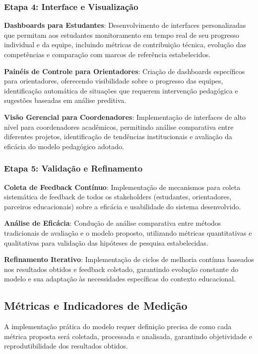 \documentclass[12pt,a4paper]{article}
\begin{document}
\subsubsection{Etapa 4: Interface e Visualização}

\textbf{Dashboards para Estudantes}: Desenvolvimento de interfaces personalizadas que permitam aos estudantes monitoramento em tempo real de seu progresso individual e da equipe, incluindo métricas de contribuição técnica, evolução das competências e comparação com marcos de referência estabelecidos.

\textbf{Painéis de Controle para Orientadores}: Criação de dashboards específicos para orientadores, oferecendo visibilidade sobre o progresso das equipes, identificação automática de situações que requerem intervenção pedagógica e sugestões baseadas em análise preditiva.

\textbf{Visão Gerencial para Coordenadores}: Implementação de interfaces de alto nível para coordenadores acadêmicos, permitindo análise comparativa entre diferentes projetos, identificação de tendências institucionais e avaliação da eficácia do modelo pedagógico adotado.

\subsubsection{Etapa 5: Validação e Refinamento}

\textbf{Coleta de Feedback Contínuo}: Implementação de mecanismos para coleta sistemática de feedback de todos os stakeholders (estudantes, orientadores, parceiros educacionais) sobre a eficácia e usabilidade do sistema desenvolvido.

\textbf{Análise de Eficácia}: Condução de análise comparativa entre métodos tradicionais de avaliação e o modelo proposto, utilizando métricas quantitativas e qualitativas para validação das hipóteses de pesquisa estabelecidas.

\textbf{Refinamento Iterativo}: Implementação de ciclos de melhoria contínua baseados nos resultados obtidos e feedback coletado, garantindo evolução constante do modelo e sua adaptação às necessidades específicas do contexto educacional.

\subsection{Métricas e Indicadores de Medição}

A implementação prática do modelo requer definição precisa de como cada métrica
proposta será coletada, processada e analisada, garantindo objetividade e
reprodutibilidade dos resultados obtidos.
\end{document}
